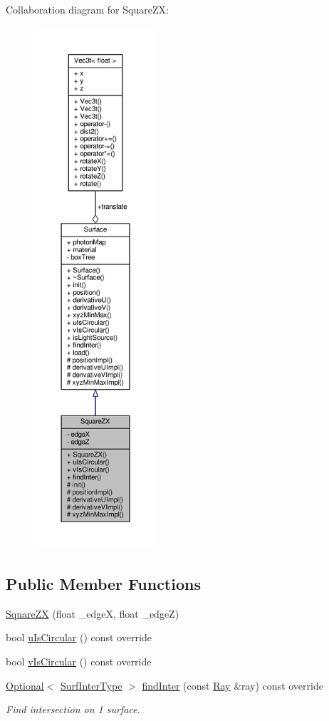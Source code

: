 Collaboration diagram for Square\+ZX\+:\nopagebreak
\begin{figure}[H]
\begin{center}
\leavevmode
\includegraphics[height=550pt]{classSquareZX__coll__graph}
\end{center}
\end{figure}
\subsection*{Public Member Functions}
\begin{DoxyCompactItemize}
\item 
\hyperlink{classSquareZX_a18592605121c1b9f52aefd5895ee144c}{Square\+ZX} (float \+\_\+edgeX, float \+\_\+edgeZ)
\item 
bool \hyperlink{classSquareZX_a912de0928a8332afb6cb89179595668a}{u\+Is\+Circular} () const override
\item 
bool \hyperlink{classSquareZX_a5556f34a0c9e6c07f59c488857937b35}{v\+Is\+Circular} () const override
\item 
\hyperlink{classOptional}{Optional}$<$ \hyperlink{structSurfInterType}{Surf\+Inter\+Type} $>$ \hyperlink{classSquareZX_a2de50bbf52fc3243eaf1b68099224321}{find\+Inter} (const \hyperlink{structRay}{Ray} \&ray) const override
\begin{DoxyCompactList}\small\item\em Find intersection on 1 surface. \end{DoxyCompactList}\end{DoxyCompactItemize}
